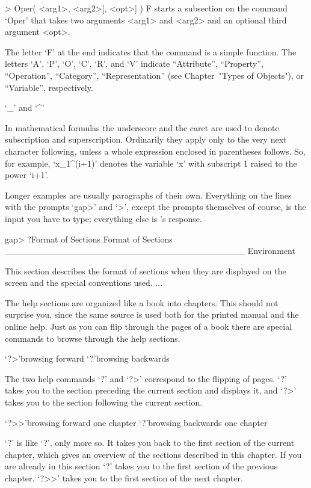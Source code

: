 \begintt
> Oper( <arg1>, <arg2>[, <opt>] ) F
\endtt
starts a subsection on the command `Oper' that takes two arguments <arg1>
and <arg2> and an optional third argument <opt>.

The letter `F' at the end
indicates that the command is a simple function.
The letters `A', `P', `O', `C', `R', and `V' indicate
``Attribute'', ``Property'', ``Operation'', ``Category'', ``Representation''
(see Chapter~"Types of Objects"), or ``Variable'', respectively.

`_' and `^'

In mathematical formulas the underscore and the caret are used to denote
subscription and superscription. Ordinarily they apply only to the very
next character following, unless a whole expression enclosed in
parentheses follows. So, for example, `x_1^(i+1)' denotes the variable `x'
with subscript 1 raised to the power `i+1'.

Longer examples are usually paragraphs of their own.
Everything on the lines with the prompts `gap>' and `>', except
the prompts themselves of course, is the input you have to type;
everything else is {\GAP}'s response.

\begintt
gap> ?Format of Sections
Format of Sections ______________________________________ Environment

This section describes the format of sections when they are displayed
on the screen and the special conventions used.
... 
\endtt


The help sections are organized like a book into chapters. This should
not surprise you, since the same source is used both for the printed
manual and the online help. Just as you can flip through the pages of a
book there are special commands to browse through the help sections.

\>`?>'{browsing forward}
\>`?\<'{browsing backwards}

The two help commands `?\<' and `?>' correspond to the flipping of pages.
`?\<' takes you to the section preceding the current section and displays
it, and `?>' takes you to the section following the current section.

\>`?>>'{browsing forward one chapter}
\>`?\<\<'{browsing backwards one chapter}

`?\<\<' is like `?\<', only more so. It takes you back to the first
section of the current chapter, which gives an overview of the sections
described in this chapter. If you are already in this section `?\<\<'
takes you to the first section of the previous chapter. `?>>' takes you
to the first section of the next chapter.

